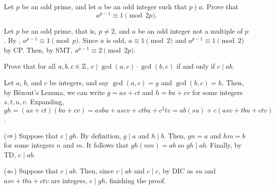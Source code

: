 \documentclass{agony}
\begin{document}
\begin{prob}
  Let $p$ be an odd prime, and let $a$ be an odd integer such that $p \nmid a$.
  Prove that \[ a^{p-1} \equiv 1 \pmod{2p}. \]
\end{prob}
\begin{prf}
  Let $p$ be an odd prime, that is, $p \neq 2$, and $a$ be an odd integer not a multiple of $p$.
  By \FLT, $a^{p-1} \equiv 1 \pmod p$.
  Since $a$ is odd, $a \equiv 1 \pmod 2$ and $a^{p-1} \equiv 1 \pmod 2$ by CP\@.
  Then, by SMT, $a^{p-1} \equiv 2 \pmod{2p}$.
\end{prf}

\begin{prob}
  Prove that for all $a,b,c \in \mathbb{Z}$, $c \mid \gcd(a,c) \cdot \gcd(b,c)$ if and only if $c \mid ab$.
\end{prob}
\begin{prf}
  Let $a$, $b$, and $c$ be integers, and say $\gcd(a,c) = g$ and $\gcd(b,c) = h$.
  Then, by Bézout's Lemma, we can write $g = as + ct$ and $h = bu + cv$ for some integers $s,t,u,v$.
  Expanding, $gh = (as + ct)(bu + cv) = asbu + ascv + ctbu + c^2tv = ab(su) + c(asv+tbu+ctv)$.

  ($\Rightarrow$) Suppose that $c \mid gh$.
  By definition, $g \mid a$ and $h \mid b$.
  Then, $gn = a$ and $hm = b$ for some integers $n$ and $m$.
  It follows that $gh(nm) = ab$ so $gh \mid ab$.
  Finally, by TD, $c \mid ab$.

  ($\Leftarrow$) Suppose that $c \mid ab$.
  Then, since $c \mid ab$ and $c \mid c$, by DIC as $su$ and $asv+tbu+ctv$ are integers, $c \mid gh$,
  finishing the proof.
\end{prf}
\end{document}
